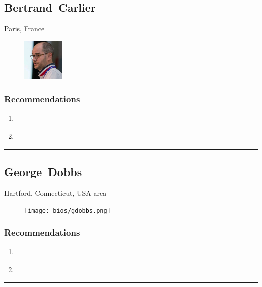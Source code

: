 \subsection{Bertrand~Carlier} \textsf{Paris, France} \par \setlength{\columnsep}{0pt} \begin{figure} \centering \includegraphics[width=0.18\textwidth]{bios/bcarlier.jpg} \end{figure}  \subsubsection{Recommendations}\begin{enumerate}
\item \cite{Bertocci2019}
\item \cite{Siriwardena2016}
\end{enumerate}\noindent\rule{\textwidth}{0.2pt}

\subsection{George~Dobbs} \textsf{Hartford, Connecticut, USA area} \par \setlength{\columnsep}{0pt} \begin{figure} \centering \texttt{[image: bios/gdobbs.png]} \end{figure}  \subsubsection{Recommendations}\begin{enumerate}
\item \cite{Cameron2005}
\item \cite{Hoffman1977}
\end{enumerate}\noindent\rule{\textwidth}{0.2pt}

